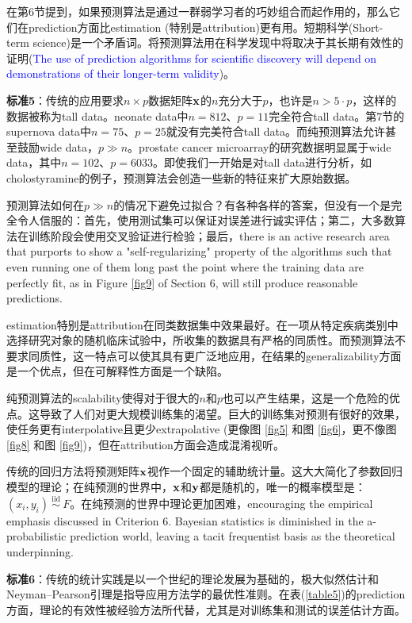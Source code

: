\documentclass[lang=cn,11pt,a4paper,cite=authoryear]{elegantpaper}
\begin{document}
在第6节提到，如果预测算法是通过一群弱学习者的巧妙组合而起作用的，那么它们在prediction方面比estimation (特别是attribution)更有用。短期科学(Short-term science)是一个矛盾词。将预测算法用在科学发现中将取决于其长期有效性的证明(\textcolor{blue}{The use of prediction algorithms for scientific discovery will depend on demonstrations of their longer-term validity})。

\textbf{标准5}：传统的应用要求$n\times p$数据矩阵$\bold{x}$的$n$充分大于$p$，也许是$n > 5\cdot p$，这样的数据被称为tall data。neonate data中$n=812$、$p=11$完全符合tall data。第7节的supernova data中$n=75$、$p=25$就没有完美符合tall data。而纯预测算法允许甚至鼓励wide data，$p \gg n$。prostate cancer microarray的研究数据明显属于wide data，其中$n=102$、$p=6033$。即使我们一开始是对tall data进行分析，如cholostyramine的例子，预测算法会创造一些新的特征来扩大原始数据。

预测算法如何在$p \gg n$的情况下避免过拟合？有各种各样的答案，但没有一个是完全令人信服的：首先，使用测试集可以保证对误差进行诚实评估；第二，大多数算法在训练阶段会使用交叉验证进行检验；最后，there is an active research area that purports to show a "self-regularizing" property of the algorithms such that even running one of them long past the point where the training data are perfectly fit, as in Figure \ref{fig9} of Section 6, will still produce reasonable predictions.

estimation特别是attribution在同类数据集中效果最好。在一项从特定疾病类别中选择研究对象的随机临床试验中，所收集的数据具有严格的同质性。而预测算法不要求同质性，这一特点可以使其具有更广泛地应用，在结果的generalizability方面是一个优点，但在可解释性方面是一个缺陷。

纯预测算法的scalability使得对于很大的$n$和$p$也可以产生结果，这是一个危险的优点。这导致了人们对更大规模训练集的渴望。巨大的训练集对预测有很好的效果，使任务更有interpolative且更少extrapolative (更像图 \ref{fig5} 和图 \ref{fig6}，更不像图 \ref{fig8} 和图 \ref{fig9})，但在attribution方面会造成混淆视听。

传统的回归方法将预测矩阵$\bold{x}$视作一个固定的辅助统计量。这大大简化了参数回归模型的理论；在纯预测的世界中，$\bold{x}$和$\bold{y}$都是随机的，唯一的概率模型是：$\left(x_{i}, y_{i}\right) \stackrel{\text { iid }}{\sim} F$。在纯预测的世界中理论更加困难，encouraging the empirical emphasis discussed in Criterion 6. Bayesian statistics is diminished in the a-probabilistic prediction world, leaving a tacit frequentist basis as the theoretical underpinning.

\textbf{标准6}：传统的统计实践是以一个世纪的理论发展为基础的，极大似然估计和Neyman–Pearson引理是指导应用方法学的最优性准则。在表(\ref{table5})的prediction方面，理论的有效性被经验方法所代替，尤其是对训练集和测试的误差估计方面。
\end{document}
